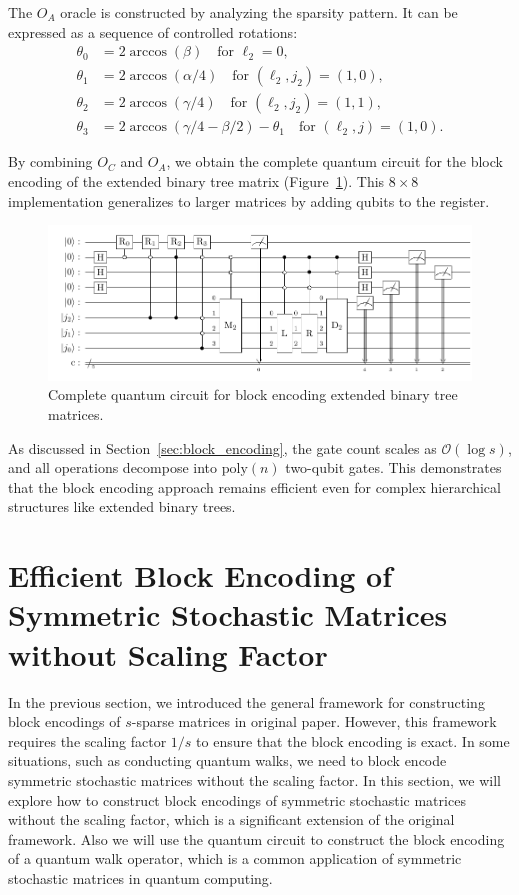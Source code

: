 \documentclass{article}
\begin{document}
The $O_A$ oracle is constructed by analyzing the sparsity pattern. It can be expressed as a sequence of controlled rotations:
$$
\begin{aligned}
\theta_0 &= 2\arccos(\beta) \quad \text{for } \ell_2 = 0, \\
\theta_1 &= 2\arccos(\alpha/4) \quad \text{for } (\ell_2, j_2) = (1,0), \\
\theta_2 &= 2\arccos(\gamma/4) \quad \text{for } (\ell_2, j_2) = (1,1), \\
\theta_3 &= 2\arccos(\gamma/4 - \beta/2) - \theta_1 \quad \text{for } (\ell_2, j) = (1,0).
\end{aligned}
$$

By combining $O_C$ and $O_A$, we obtain the complete quantum circuit for the block encoding of the extended binary tree matrix (Figure~\ref{fig:tree_circuit}). This $8 \times 8$ implementation generalizes to larger matrices by adding qubits to the register.

\begin{figure}[htbp]
  \centering
  \includegraphics{pdf/tree_circuit}
  \caption{Complete quantum circuit for block encoding extended binary tree matrices.}
  \label{fig:tree_circuit}
\end{figure}

As discussed in Section~\ref{sec:block_encoding}, the gate count scales as $\mathcal{O}(\log s)$, and all operations decompose into $\mathrm{poly}(n)$ two-qubit gates. This demonstrates that the block encoding approach remains efficient even for complex hierarchical structures like extended binary trees.

\section{Efficient Block Encoding of Symmetric Stochastic Matrices without Scaling Factor}\label{sec:efficient-block-encoding-of-symmetric-stochastic-matrices-without-scaling-factor}
In the previous section, we introduced the general framework for constructing block encodings of $s$-sparse matrices in original paper.
However, this framework requires the scaling factor $1/s$ to ensure that the block encoding is exact.
In some situations, such as conducting quantum walks, we need to block encode symmetric stochastic matrices without the scaling factor.
In this section, we will explore how to construct block encodings of symmetric stochastic matrices without the scaling factor, which is a significant extension of the original framework.
Also we will use the quantum circuit to construct the block encoding of a quantum walk operator, which is a common application of symmetric stochastic matrices in quantum computing.
\end{document}

